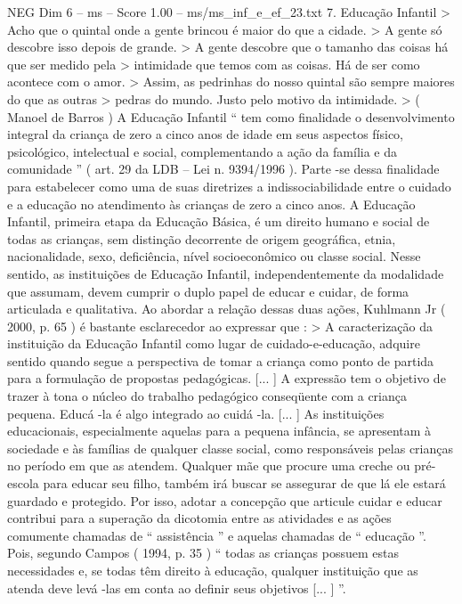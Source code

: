 \begin{textsample}{NEG Dim 6 – ms – Score 1.00 – ms/ms\_inf\_e\_ef\_23.txt}  \label{ex:f6_neg_236}
7.
Educação Infantil > Acho que o quintal onde a gente brincou é maior do que a cidade. > A gente só descobre isso depois de grande. > A gente descobre que o tamanho das coisas há que ser medido pela > intimidade que temos com as coisas.
Há de ser como acontece com o amor. > Assim, as pedrinhas do nosso quintal são sempre maiores do que as outras > pedras do mundo.
Justo pelo motivo da intimidade. > ( Manoel de Barros ) A Educação Infantil “ tem como finalidade o desenvolvimento integral da criança de zero a cinco anos de idade em seus aspectos físico, psicológico, intelectual e social, complementando a ação da família e da comunidade ” ( art. 29 da LDB – Lei n. 9394/1996 ).
Parte -se dessa finalidade para estabelecer como uma de suas diretrizes a indissociabilidade entre o cuidado e a educação no atendimento às crianças de zero a cinco anos.
A Educação Infantil, primeira etapa da Educação Básica, é um direito humano e social de todas as crianças, sem distinção decorrente de origem geográfica, etnia, nacionalidade, sexo, deficiência, nível socioeconômico ou classe social.
Nesse sentido, as instituições de Educação Infantil, independentemente da modalidade que assumam, devem cumprir o duplo papel de educar e cuidar, de forma articulada e qualitativa.
Ao abordar a relação dessas duas ações, Kuhlmann Jr ( 2000, p. 65 ) é bastante esclarecedor ao expressar que : > A caracterização da instituição da Educação Infantil como lugar de cuidado-e-educação, adquire sentido quando segue a perspectiva de tomar a criança como ponto de partida para a formulação de propostas pedagógicas. [... ] A expressão tem o objetivo de trazer à tona o núcleo do trabalho pedagógico conseqüente com a criança pequena.
Educá -la é algo integrado ao cuidá -la. [... ] As instituições educacionais, especialmente aquelas para a pequena infância, se apresentam à sociedade e às famílias de qualquer classe social, como responsáveis pelas crianças no período em que as atendem.
Qualquer mãe que procure uma creche ou pré-escola para educar seu filho, também irá buscar se assegurar de que lá ele estará guardado e protegido.
Por isso, adotar a concepção que articule cuidar e educar contribui para a superação da dicotomia entre as atividades e as ações comumente chamadas de “ assistência ” e aquelas chamadas de “ educação ”.
Pois, segundo Campos ( 1994, p. 35 ) “ todas as crianças possuem estas necessidades e, se todas têm direito à educação, qualquer instituição que as atenda deve levá -las em conta ao definir seus objetivos [... ] ”.

\end{textsample}
